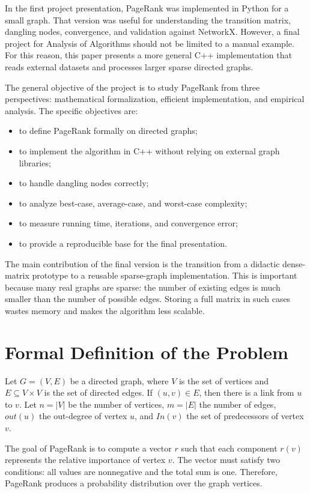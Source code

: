 \documentclass[runningheads]{llncs}
\begin{document}
In the first project presentation, PageRank was implemented in Python for a small graph. That version was useful for understanding the transition matrix, dangling nodes, convergence, and validation against NetworkX. However, a final project for Analysis of Algorithms should not be limited to a manual example. For this reason, this paper presents a more general C++ implementation that reads external datasets and processes larger sparse directed graphs.

The general objective of the project is to study PageRank from three perspectives: mathematical formalization, efficient implementation, and empirical analysis. The specific objectives are:

\begin{itemize}
\item to define PageRank formally on directed graphs;
\item to implement the algorithm in C++ without relying on external graph libraries;
\item to handle dangling nodes correctly;
\item to analyze best-case, average-case, and worst-case complexity;
\item to measure running time, iterations, and convergence error;
\item to provide a reproducible base for the final presentation.
\end{itemize}

The main contribution of the final version is the transition from a didactic dense-matrix prototype to a reusable sparse-graph implementation. This is important because many real graphs are sparse: the number of existing edges is much smaller than the number of possible edges. Storing a full matrix in such cases wastes memory and makes the algorithm less scalable.

\section{Formal Definition of the Problem}

Let \(G=(V,E)\) be a directed graph, where \(V\) is the set of vertices and \(E \subseteq V \times V\) is the set of directed edges. If \((u,v)\in E\), then there is a link from \(u\) to \(v\). Let \(n=|V|\) be the number of vertices, \(m=|E|\) the number of edges, \(out(u)\) the out-degree of vertex \(u\), and \(In(v)\) the set of predecessors of vertex \(v\).

The goal of PageRank is to compute a vector \(r\) such that each component \(r(v)\) represents the relative importance of vertex \(v\). The vector must satisfy two conditions: all values are nonnegative and the total sum is one. Therefore, PageRank produces a probability distribution over the graph vertices.
\end{document}
